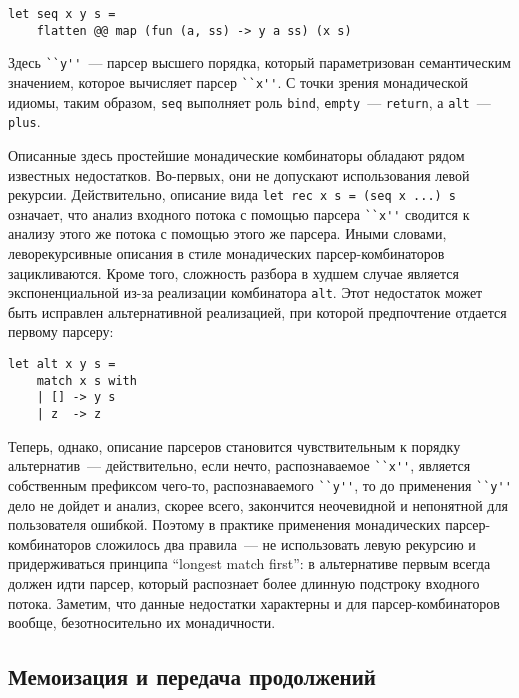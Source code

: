 \documentclass[conference]{IEEEtran}
\begin{document}
\begin{lstlisting}[basicstyle=\small]
  let seq x y s =
    flatten @@ map (fun (a, ss) -> y a ss) (x s)
\end{lstlisting}

Здесь \lstinline|``y''|~--- парсер высшего порядка, который параметризован семантическим значением, которое вычисляет парсер \lstinline|``x''|. С точки зрения монадической
идиомы, таким образом, \lstinline|seq| выполняет роль \lstinline|bind|, \lstinline|empty|~--- \lstinline|return|, а \lstinline|alt|~--- \lstinline|plus|.

Описанные здесь простейшие монадические комбинаторы обладают рядом известных недостатков. Во-первых, они не допускают использования левой рекурсии. Действительно, описание
вида \lstinline|let rec x s = (seq x ...) s| означает, что анализ входного потока с помощью парсера \lstinline|``x''| сводится к анализу этого же потока с помощью этого
же парсера. Иными словами, леворекурсивные описания в стиле монадических парсер-комбинаторов зацикливаются. Кроме того, сложность разбора в худшем случае является экспоненциальной
из-за реализации комбинатора \lstinline|alt|. Этот недостаток может быть исправлен альтернативной реализацией, при которой предпочтение отдается первому парсеру:

\begin{lstlisting}[basicstyle=\small]
  let alt x y s =
    match x s with
    | [] -> y s
    | z  -> z
\end{lstlisting}

Теперь, однако, описание парсеров становится чувствительным к порядку альтернатив~--- действительно, если нечто, распознаваемое \lstinline|``x''|, является собственным префиксом
чего-то, распознаваемого \lstinline|``y''|, то до применения \lstinline|``y''| дело не дойдет и анализ, скорее всего, закончится неочевидной и непонятной для
пользователя ошибкой. Поэтому в практике применения монадических парсер-комбинаторов сложилось два правила~--- не использовать левую рекурсию и придерживаться
принципа ``longest match first'': в альтернативе первым всегда должен идти парсер, который распознает более длинную подстроку входного потока. Заметим, что данные недостатки
характерны и для парсер-комбинаторов вообще, безотносительно их монадичности.

\subsection{Мемоизация и передача продолжений}
\end{document}

